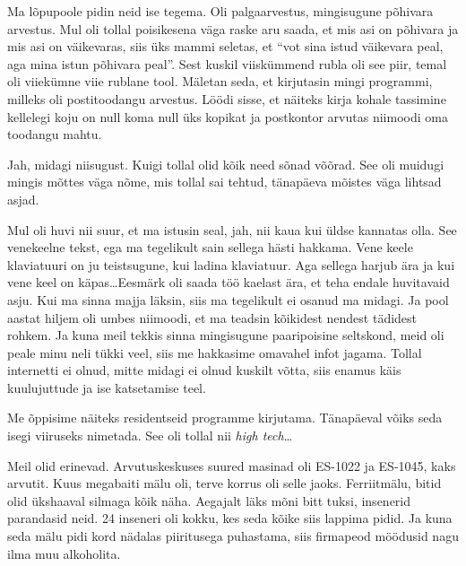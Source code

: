
Ma lõpupoole pidin neid ise tegema. Oli palgaarvestus, mingisugune põhivara arvestus. Mul oli tollal poisikesena väga raske aru saada, et mis asi on põhivara ja mis asi on väikevaras, siis üks mammi seletas, et \enquote{vot sina istud väikevara peal, aga mina istun põhivara peal}. Sest kuskil viiskümmend rubla oli see piir, temal oli  viiekümne viie rublane tool. Mäletan seda, et kirjutasin mingi programmi, milleks oli postitoodangu arvestus. Löödi sisse, et  näiteks kirja kohale tassimine kellelegi koju on null koma null üks kopikat ja postkontor arvutas niimoodi oma toodangu mahtu. 


Jah, midagi niisugust. Kuigi tollal olid kõik need sõnad võõrad. See oli muidugi mingis mõttes väga nõme, mis tollal sai tehtud, tänapäeva mõistes väga lihtsad asjad. 


Mul oli huvi nii suur, et ma istusin seal, jah, nii kaua kui  üldse kannatas olla. See venekeelne tekst, ega ma tegelikult sain sellega hästi hakkama. Vene keele klaviatuuri on ju teistsugune, kui ladina klaviatuur. Aga sellega harjub ära ja kui vene keel on käpas\ldots Eesmärk oli saada töö kaelast ära, et teha endale huvitavaid asju. Kui ma sinna majja läksin, siis ma tegelikult ei osanud ma midagi. Ja pool aastat hiljem oli umbes niimoodi, et ma teadsin kõikidest nendest tädidest rohkem. Ja kuna meil tekkis sinna mingisugune paaripoisine seltskond, meid oli  peale minu neli tükki veel, siis me  hakkasime omavahel infot jagama. Tollal internetti ei olnud, mitte midagi ei olnud kuskilt võtta, siis enamus käis kuulujuttude ja ise katsetamise teel. 

Me õppisime näiteks residentseid programme kirjutama. Tänapäeval võiks seda isegi viiruseks nimetada.  See oli tollal nii \emph{high tech}\ldots


Meil olid erinevad. Arvutuskeskuses suured masinad oli ES-1022 ja ES-1045, kaks arvutit. Kuus megabaiti mälu oli, terve korrus oli selle jaoks. Ferriitmälu, bitid olid ükshaaval silmaga kõik näha. Aegajalt läks mõni bitt tuksi,  insenerid parandasid neid. 24 inseneri oli kokku, kes seda kõike siis lappima pidid. Ja kuna seda mälu pidi kord nädalas piiritusega puhastama, siis firmapeod möödusid nagu ilma muu alkoholita.  

